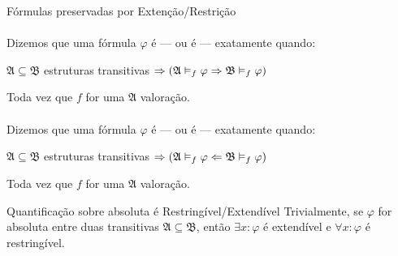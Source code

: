            \begin{definition}{Fórmulas preservadas por Extenção/Restrição}
                \paragraph{}
                    Dizemos que uma fórmula $\varphi$ é  --- ou é  ---
                    exatamente quando:
                \begin{center}
                    $\mathfrak{A}\subseteq\mathfrak{B}$ estruturas transitivas $\Rightarrow ( \mathfrak{A}\vDash_f\varphi\Rightarrow\mathfrak{B}\vDash_f\varphi)$
                \end{center}
                Toda vez que $f$ for uma $\mathfrak{A}$ valoração.
                \paragraph{}
                    Dizemos que uma fórmula $\varphi$ é  --- ou é  ---
                    exatamente quando:
                \begin{center}
                    $\mathfrak{A}\subseteq\mathfrak{B}$ estruturas transitivas $\Rightarrow ( \mathfrak{A}\vDash_f\varphi\Leftarrow\mathfrak{B}\vDash_f\varphi)$
                \end{center}
                Toda vez que $f$ for uma $\mathfrak{A}$ valoração.
            \end{definition}
            \begin{lemma}{Quantificação sobre absoluta é Restringível/Extendível}
                Trivialmente, se $\varphi$ for absoluta entre duas transitivas $\mathfrak{A}\subseteq\mathfrak{B}$, então $\exists x:\varphi$ é extendível e 
                $\forall x:\varphi$ é restringível.
            \end{lemma}
